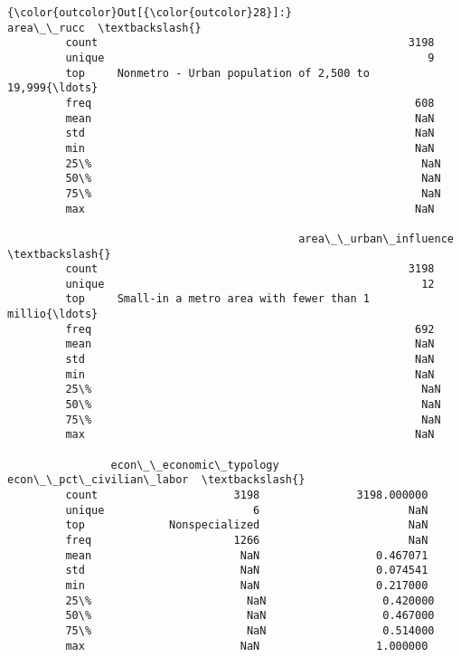 \documentclass[11pt]{article}
\begin{document}
\begin{Verbatim}[commandchars=\\\{\}]
{\color{outcolor}Out[{\color{outcolor}28}]:}                                                area\_\_rucc  \textbackslash{}
         count                                                3198   
         unique                                                  9   
         top     Nonmetro - Urban population of 2,500 to 19,999{\ldots}   
         freq                                                  608   
         mean                                                  NaN   
         std                                                   NaN   
         min                                                   NaN   
         25\%                                                   NaN   
         50\%                                                   NaN   
         75\%                                                   NaN   
         max                                                   NaN   
         
                                             area\_\_urban\_influence  \textbackslash{}
         count                                                3198   
         unique                                                 12   
         top     Small-in a metro area with fewer than 1 millio{\ldots}   
         freq                                                  692   
         mean                                                  NaN   
         std                                                   NaN   
         min                                                   NaN   
         25\%                                                   NaN   
         50\%                                                   NaN   
         75\%                                                   NaN   
         max                                                   NaN   
         
                econ\_\_economic\_typology  econ\_\_pct\_civilian\_labor  \textbackslash{}
         count                     3198               3198.000000   
         unique                       6                       NaN   
         top             Nonspecialized                       NaN   
         freq                      1266                       NaN   
         mean                       NaN                  0.467071   
         std                        NaN                  0.074541   
         min                        NaN                  0.217000   
         25\%                        NaN                  0.420000   
         50\%                        NaN                  0.467000   
         75\%                        NaN                  0.514000   
         max                        NaN                  1.000000   
         

\end{Verbatim}
\end{document}
